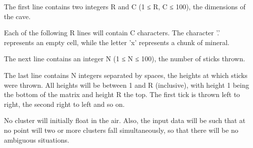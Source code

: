 The first line contains two integers R and C (1 ≤ R, C ≤ 100), the dimensions of the cave.  

   Each of the following R lines will contain C characters. The character '.' represents an empty cell, while the letter 'x' represents a chunk of mineral.  

   The next line contains an integer N (1 ≤ N ≤ 100), the number of sticks thrown.  

   The last line contains N integers separated by spaces, the heights at which sticks were thrown. All heights will be between 1 and R (inclusive), with height 1 being the bottom of the matrix and height R the top. The first tick is thrown left to right, the second right to left and so on.  

   No cluster will initially float in the air. Also, the input data will be such that at no point will two or more clusters fall simultaneously, so that there will be no ambiguous situations.  

\